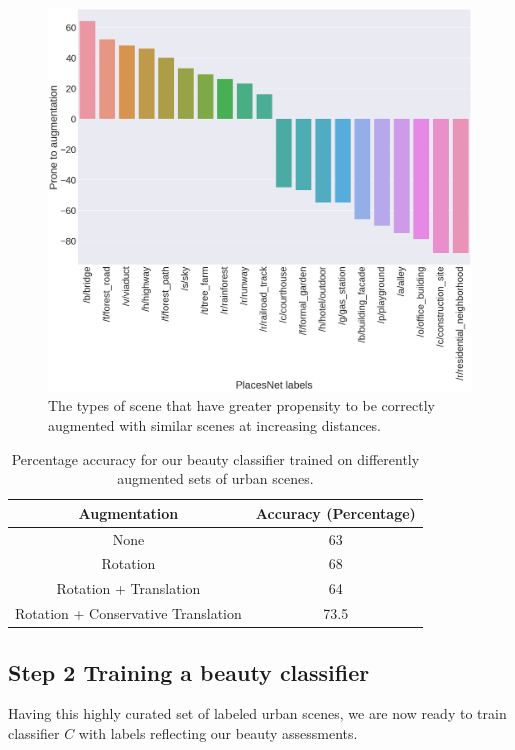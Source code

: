 \begin{figure}[t!]
	\centering
	\includegraphics[width=\columnwidth]{Plot/SimilarityPlacesPrevalence.png}
	\caption{The types of scene that have greater propensity to be correctly augmented with similar scenes at increasing distances.}
	\label{fig:augmentationSimilarity}
\end{figure}




\begin{table}[t!]
	\centering
	\begin{tabular}{|c|c|}
		\hline
		\textbf{Augmentation} & \textbf{Accuracy (Percentage)}\\
		\hline
		None & 63 \\
		\hline
		Rotation  & 68 \\
		\hline
		Rotation + Translation  & 64 \\
		\hline
		Rotation + Conservative Translation & 73.5 \\
		\hline
	\end{tabular}
	\caption{Percentage accuracy for our beauty classifier trained on differently augmented sets of  urban scenes.}
	\label{tab:classifier}
    \vspace{-10mm}
\end{table}


\subsection*{Step 2 Training a beauty classifier}
\label{Sec:Classifier}
Having this highly curated set of labeled urban scenes, we are now ready to train classifier $C$ with labels reflecting our beauty assessments. 

